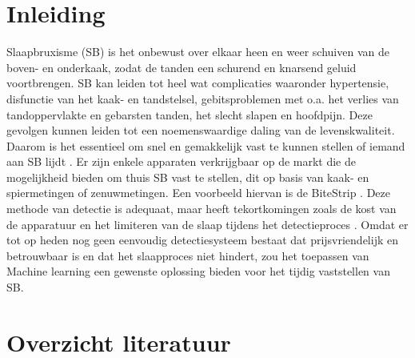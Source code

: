 \documentclass{hogent-article}
\affiliation{
  \textsuperscript{1} \href{mailto:brent.decorte@student.hogent.be}{brent.decorte@student.hogent.be}}
\begin{document}
\flushbottom %
\maketitle %
\tableofcontents %
\thispagestyle{empty} %


\section{Inleiding}

Slaapbruxisme (SB) is het onbewust over elkaar heen en weer  schuiven van de boven- en onderkaak, zodat de tanden een schurend en knarsend geluid voortbrengen. SB kan leiden tot heel wat complicaties waaronder hypertensie, disfunctie van het kaak- en tandstelsel, gebitsproblemen met o.a. het verlies van tandoppervlakte en gebarsten tanden, het slecht slapen en hoofdpijn. Deze gevolgen kunnen leiden tot een noemenswaardige daling van de levenskwaliteit.  Daarom is het essentieel om snel en gemakkelijk vast te kunnen stellen of  iemand  aan  SB lijdt .
\bigbreak
\noindent
Er zijn enkele apparaten verkrijgbaar op de markt die  de mogelijkheid bieden om thuis SB vast te stellen, dit op basis van kaak- en spiermetingen of zenuwmetingen. Een voorbeeld hiervan is de BiteStrip \cite{Shochat_2007}.  Deze methode van detectie is adequaat, maar heeft tekortkomingen zoals de kost van de apparatuur en het limiteren van de slaap tijdens het detectieproces . 
\bigbreak
\noindent
Omdat er tot op heden nog geen eenvoudig detectiesysteem bestaat dat prijsvriendelijk en betrouwbaar is en  dat het slaapproces niet hindert, zou het toepassen van Machine learning een gewenste oplossing bieden voor het tijdig vaststellen van SB.








\section{Overzicht literatuur}
\end{document}
